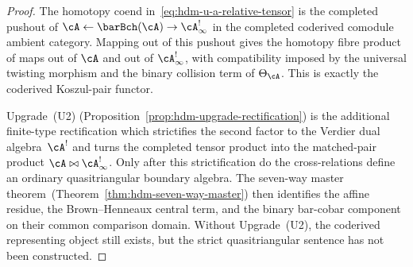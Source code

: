 \begin{proof}
The homotopy coend in~\eqref{eq:hdm-u-a-relative-tensor} is the
completed pushout of
$\cA \leftarrow \barBch(\cA) \to \cA^{!}_\infty$ in the completed
coderived comodule ambient category. Mapping out of this pushout gives the
homotopy fibre product of maps out of $\cA$ and out of
$\cA^{!}_\infty$, with compatibility imposed by the universal twisting
morphism and the binary collision term of $\Theta_\cA$. This is exactly
the coderived Koszul-pair functor.

Upgrade~\textup{(U2)}
(Proposition~\ref{prop:hdm-upgrade-rectification}) is the additional
finite-type rectification which strictifies the second factor to the
Verdier dual algebra~$\cA^!$ and turns the completed tensor product into
the matched-pair product $\cA\bowtie\cA^!_\infty$. Only after this
strictification do the cross-relations define an ordinary
quasitriangular boundary algebra. The seven-way master
theorem~\textup{(}Theorem~\textup{\ref{thm:hdm-seven-way-master}}\textup{)}
then identifies the affine residue, the Brown--Henneaux central term,
and the binary bar-cobar component on their common comparison domain.
Without Upgrade~\textup{(U2)}, the coderived representing object still
exists, but the strict quasitriangular sentence has not been constructed.
\end{proof}

